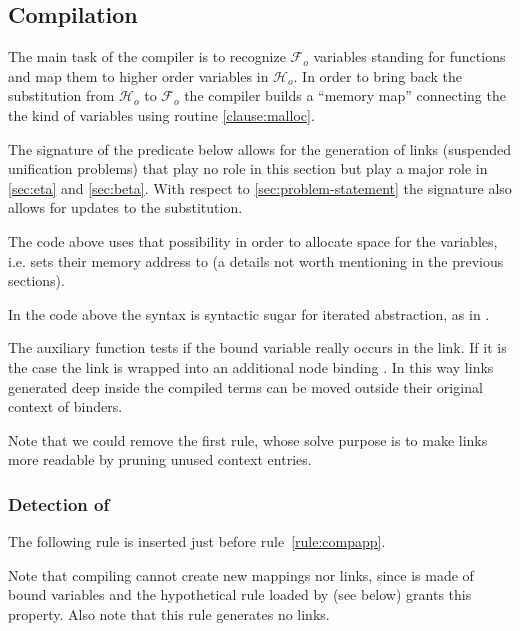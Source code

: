 \documentclass[sigconf,natbib=false,review]{acmart}
\newcommand{\Fo}{\ensuremath{\mathcal{F}_{\!o}\xspace}} %
\newcommand{\Ho}{\ensuremath{\mathcal{H}_o}\xspace}
\begin{document}
\subsection{Compilation}
\label{sec:compilation}

The main task of the compiler is to recognize \Fo{} variables standing
for functions and map them to higher order variables in \Ho.
In order to bring back the substitution from \Ho{} to \Fo{} the compiler
builds a ``memory map'' connecting the the kind of variables using routine
\ref{clause:malloc}.

The signature of the  predicate below allows for the generation of
links (suspended unification problems) that play no role in this section
but play a major role in \cref{sec:eta} and \cref{sec:beta}.
With respect to \cref{sec:problem-statement} the signature also allows
for updates to the substitution.



\noindent
The code above uses that possibility
in order to allocate space for the variables, i.e. sets their memory
address to  (a details not worth mentioning in the
previous sections).



\noindent
In the code above the syntax  is syntactic sugar for
iterated  abstraction, as in .

The auxiliary function  tests if the bound variable
 really occurs in the link. If it is the case the link is wrapped into
an additional  node binding . In this way links generated
deep inside the compiled terms can be moved outside their original context
of binders.



\noindent
Note that we could remove the first rule, whose solve purpose is to make
links more readable by pruning unused context entries.

\subsubsection{Detection of \maybebeta}

The following rule is inserted just before rule~\ref{rule:compapp}.



\noindent
Note that compiling  cannot create new mappings nor links, since 
is made of bound variables and the hypothetical rule loaded by 
(see below) grants this property. Also note that this rule generates no links.
\end{document}
